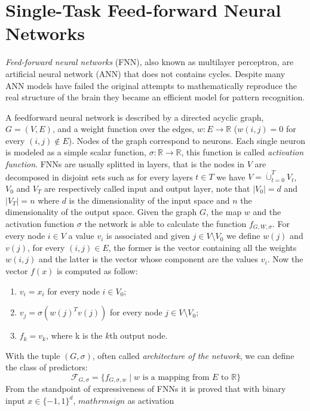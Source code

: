 \section{Single-Task Feed-forward Neural Networks}
\emph{Feed-forward neural networks} (FNN), also known as multilayer perceptron, are artificial neural network (ANN) that does not contains cycles. Despite many ANN models have failed the original attempts to mathematically reproduce the real structure of the brain they became an efficient model for pattern recognition. 

A feedforward neural network is described by a directed acyclic graph, $G =
(V,E)$, and a weight function over the edges, $w : E \to \mathbb R$ ($w(i, j) = 0$
for every $(i, j) \notin E$). Nodes of the graph correspond to neurons. Each
single neuron is modeled as a simple scalar function, $ \sigma : \mathbb R \to
\mathbb R$, this function is called \emph{activation function}. FNNs are usually
splitted in layers, that is the nodes in $V$ are decomposed in disjoint sets such
as for every layers $t \in T$ we have $V = \dot\cup_{t = 0}^T V_t$, $V_0$ and
$V_T$ are respectively called input and output layer, note that $|V_0| = d$ and
$|V_T| = n$ where $d$ is the dimensionality of the input space and $n$ the
dimensionality of the output space. Given the graph $G$, the map $w$ and the
activation function $\sigma$ the network is able to calculate the function
$f_{G,W,\sigma}$.  For every node $i \in V$ a value $v_i$ is associated and given $j
\in V \setminus V_0$ we define $w(j)$ and $v(j)$, for every $(i, j) \in E$, the
former is the vector containing all the weights $w(i, j)$ and the latter is the
vector whose component are the values $v_i$. Now the vector $f(x)$ is computed as
follow:
\begin{enumerate}
    \item $v_i = x_i$ for every node $i \in V_0$;
    \item $v_j = \sigma(w(j)^T v(j))$ for every node $j \in V \setminus V_0$;
    \item $f_k = v_k$, where k is the $k$th output node.
\end{enumerate}
With the tuple $(G, \sigma)$, often called \emph{architecture of the network}, we can define the class of predictors: 
\[ \mathcal{F}_{G, \sigma} = \{ f_{G, \sigma, w} \mid w \textrm{ is a mapping from } E \textrm{ to } \mathbb R \} \]
From the standpoint of expressiveness of FNNs it is proved that with binary input $x \in \{-1, 1\}^d$, $mathrm{sign}$ as activation
